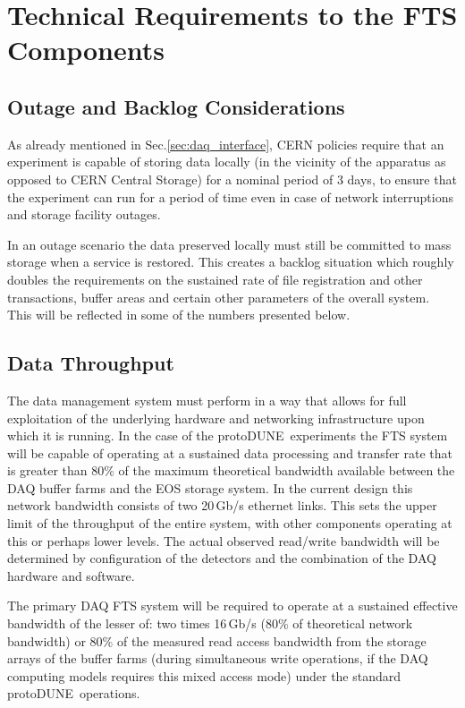 \documentclass[pdftex,12pt,letter]{article}
\newcommand{\pd}{protoDUNE\ }
\begin{document}
\section{Technical Requirements to the FTS Components}

\subsection{Outage and Backlog Considerations}
\label{sec:backlog}
As already mentioned in Sec.\ref{sec:daq_interface},
CERN policies require that an experiment is capable of storing data locally (in the vicinity of the apparatus as opposed to CERN Central
Storage)  for a nominal period of 3 days, to ensure that the experiment can run for a period of time even in case of network interruptions
and storage facility outages.

In an outage scenario the data preserved locally must still be committed to mass storage when a service is restored.
This creates a backlog situation which roughly doubles the requirements on the sustained rate of file registration and other transactions, buffer
areas and certain other parameters of the overall system. This will be reflected in some of the numbers presented below.


\subsection{Data Throughput}

The data management system must perform in a way that allows for full exploitation of the underlying hardware and networking infrastructure
upon which  it is running.  In the case of the \pd experiments the FTS system will be capable of operating at a sustained data processing and transfer
rate that is greater than 80\% of the maximum theoretical bandwidth available between the DAQ buffer farms and the EOS storage system.
In the current design this network bandwidth consists of two 20\,Gb/s ethernet links.
This sets the upper limit of the throughput of the entire system, with other components operating at this or perhaps lower levels.
The actual observed read/write bandwidth will be determined by configuration of the detectors and the combination
of the DAQ hardware and software.


  The primary DAQ FTS system will be required to operate at a sustained effective bandwidth
of the lesser of: two times 16\,Gb/s (80\% of theoretical network bandwidth) or 80\% of the measured read access bandwidth from the storage arrays
of the buffer farms
(during simultaneous write operations, if the DAQ computing models requires this mixed access mode) under the standard \pd operations.
\end{document}

